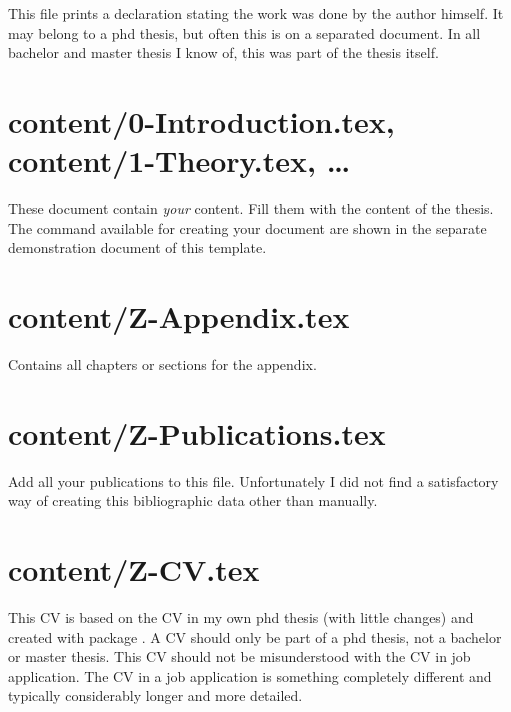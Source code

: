 This file prints a declaration stating the work was done by the author himself.
It may belong to a phd thesis, but often this is on a separated document. In all bachelor and master thesis I know of, this was part of the thesis itself.



\section{content/0-Introduction.tex, content/1-Theory.tex, \ldots}

These document contain \emph{your} content. Fill them with the content of the thesis. The command available for creating your document are shown in the separate demonstration document of this template.

\section{content/Z-Appendix.tex}

Contains all chapters or sections for the appendix.


\section{content/Z-Publications.tex}

Add all your publications to this file. Unfortunately I did not find a satisfactory way of creating this bibliographic data other than manually.


\section{content/Z-CV.tex}

This CV is based on the CV in my own phd thesis (with little changes) and created with package . A CV should only be part of a phd thesis, not a bachelor or master thesis. This CV should not be misunderstood with the CV in job application. The CV in a job application is something completely different and typically considerably longer and more detailed.

